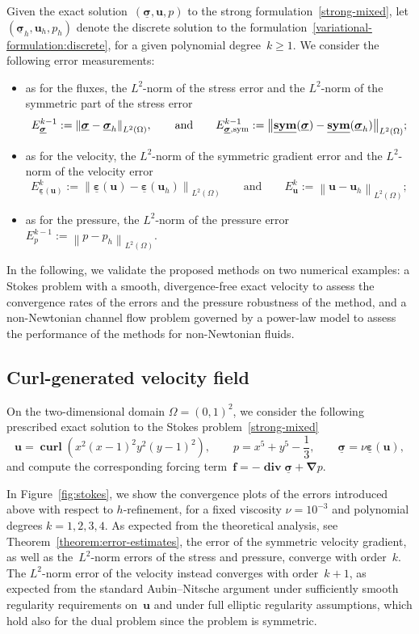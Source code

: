 \documentclass[a4paper,twoside,10pt]{article}
\theoremstyle{plain}
\theoremstyle{remark}
\theoremstyle{definition}
\numberwithin{equation}{section}
\numberwithin{figure}{section}
\newcommand{\Norm}[1]{{\left\|{#1} \right\|}}
\newcommand{\sigmabfh}{\underline{\boldsymbol{\sigma}}_h}
\newcommand{\ubfh}{\mathbf{u}_h}
\newcommand{\ph}{p_h}
\newcommand{\sigmabf}{\underline{\boldsymbol{\sigma}}}
\newcommand{\ubf}{\mathbf{u}}
\newcommand{\p}{p}
\DeclareMathOperator{\divebf}{\mathbf{div}}
\DeclareMathOperator{\curlbf}{\mathbf{curl}}
\newcommand{\sym}{\underline{\bf{sym}}}
\newcommand{\Ltwo}{L^2}
\newcommand{\fbf}{\mathbf{f}}
\newcommand{\nablabf}{\boldsymbol{\nabla}}
\newcommand{\epsbfun}{\underline{\boldsymbol{\varepsilon}}}
\newcommand{\Ekmosigmasym}{E_{\sigmabf,\rm{sym}}^{k-1}}
\newcommand{\Ekmosigma}{E_{\sigmabf}^{k-1}}
\newcommand{\Ekmop}{E_{p}^{k-1}}
\newcommand{\Eku}{E_{\ubf}^{k}}
\newcommand{\Ekepsu}{E_{\epsbfun(\ubf)}^{k}}
\begin{document}
Given the exact solution~$(\sigmabf,\ubf,\p)$ to the strong formulation~\eqref{strong-mixed}, 
let $(\sigmabfh,\ubfh,\ph)$ denote the discrete solution
to the formulation~\eqref{variational-formulation:discrete},
for a given polynomial degree~$k\geq 1$.
We consider the following error measurements:
\begin{itemize}
\item as for the fluxes,
the $\Ltwo$-norm of the stress error
and the $\Ltwo$-norm of the symmetric part of the stress error
\begin{equation*}
\Ekmosigma := \Norm{\sigmabf - \sigmabfh}_{\Ltwo(\Omega)},
\qquad\text{and}\qquad
\Ekmosigmasym := \Norm{\sym(\sigmabf) - \sym(\sigmabfh)}_{\Ltwo(\Omega)};
\end{equation*}
\item as for the velocity,
the $\Ltwo$-norm of the symmetric gradient error
and the $\Ltwo$-norm of the velocity error
\begin{equation*}
\Ekepsu := \Norm{\epsbfun(\ubf) - \epsbfun(\ubfh)}_{\Ltwo(\Omega)}
\qquad\text{and}\qquad
\Eku := \Norm{\ubf - \ubfh}_{\Ltwo(\Omega)};
\end{equation*}
\item as for the pressure,
the $\Ltwo$-norm of the pressure error
$
\Ekmop := \Norm{p - \ph}_{\Ltwo(\Omega)}.
$
\end{itemize}
In the following,
we validate the proposed methods on two numerical examples:
a Stokes problem with a smooth, divergence-free exact velocity
to assess the convergence rates of the errors and the pressure robustness of the method,
and a non-Newtonian channel flow problem governed by a power-law model
to assess the performance of the methods for non-Newtonian fluids.

\subsection{Curl-generated velocity field}  \label{subsection:stokes}
On the two-dimensional domain $\Omega = (0,1)^2$,
we consider the following prescribed exact solution to the Stokes problem~\eqref{strong-mixed}
\begin{equation*}
\ubf = \curlbf(x^2(x-1)^2y^2(y-1)^2), \qquad
\p = x^5 + y^5 - \frac{1}{3}, \qquad
\sigmabf = \nu \epsbfun(\ubf),
\end{equation*}
and compute the corresponding forcing term~$\fbf = -\divebf \sigmabf + \nablabf p$.

In Figure~\ref{fig:stokes},
we show the convergence plots of the errors introduced above
with respect to $h$-refinement,
for a fixed viscosity $\nu = 10^{-3}$
and polynomial degrees $k=1,2,3,4$.
As expected from the theoretical analysis,
see Theorem~\ref{theorem:error-estimates},
the error of the symmetric velocity gradient,
as well as the~$\Ltwo$-norm errors
of the stress and pressure,
converge with order~$k$.
The $\Ltwo$-norm error of the velocity instead converges with order~$k+1$,
as expected from the standard Aubin--Nitsche argument
under sufficiently smooth regularity requirements on~$\ubf$
and under full elliptic regularity assumptions,
which hold also for the dual problem
since the problem is symmetric.
\end{document}
